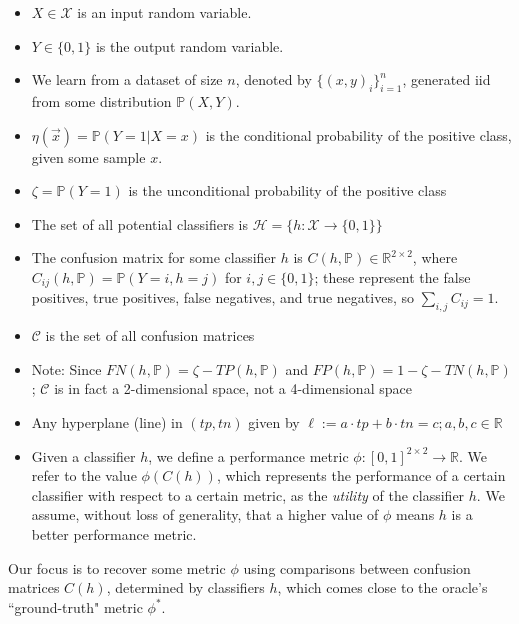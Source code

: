 \documentclass[
  letterpaper,
  DIV=11,
  numbers=noendperiod,
  oneside]{scrreprt}
\theoremstyle{remark}
\begin{document}
\begin{itemize}
\item
  \(X \in \mathcal{X}\) is an input random variable.
\item
  \(Y \in \{0, 1\}\) is the output random variable.
\item
  We learn from a dataset of size \(n\), denoted by
  \(\{(x, y)_i\}^n_{i=1}\), generated iid from some distribution
  \(\mathbb{P}(X, Y)\).
\item
  \(\eta(\vec{x}) = \mathbb{P}(Y=1 | X=x)\) is the conditional
  probability of the positive class, given some sample \(x\).
\item
  \(\zeta = \mathbb{P}(Y=1)\) is the unconditional probability of the
  positive class
\item
  The set of all potential classifiers is
  \(\mathcal{H} = \{h : \mathcal{X} \rightarrow \{0,1\}\}\)
\item
  The confusion matrix for some classifier \(h\) is
  \(C(h, \mathbb{P}) \in \mathbb{R}^{2 \times 2}\), where
  \(C_{ij}(h, \mathbb{P}) = \mathbb{P}(Y=i, h=j)\) for
  \(i, j \in \{0,1\}\); these represent the false positives, true
  positives, false negatives, and true negatives, so
  \(\sum_{i,j}C_{ij}=1\).
\item
  \(\mathcal{C}\) is the set of all confusion matrices
\item
  Note: Since \(FN(h, \mathbb{P}) =\zeta - TP(h, \mathbb{P})\) and
  \(FP(h, \mathbb{P}) = 1 - \zeta - TN(h, \mathbb{P})\); \(\mathcal{C}\)
  is in fact a 2-dimensional space, not a 4-dimensional space
\item
  Any hyperplane (line) in \((tp, tn)\) given by
  \(\ell := a \cdot tp + b \cdot tn = c; a, b, c\in \mathbb{R}\)
\item
  Given a classifier \(h\), we define a performance metric
  \(\phi : [0, 1]^{2 \times 2} \rightarrow \mathbb{R}\). We refer to the
  value \(\phi(C(h))\), which represents the performance of a certain
  classifier with respect to a certain metric, as the \emph{utility} of
  the classifier \(h\). We assume, without loss of generality, that a
  higher value of \(\phi\) means \(h\) is a better performance metric.
\end{itemize}

Our focus is to recover some metric \(\phi\) using comparisons between
confusion matrices \(C(h)\), determined by classifiers \(h\), which
comes close to the oracle's ``ground-truth" metric \(\phi^*\).
\end{document}
